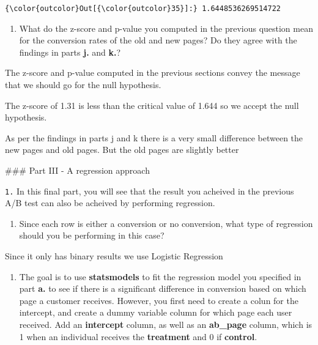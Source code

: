 \documentclass[11pt]{article}
\providecommand{\tightlist}{%
      \setlength{\itemsep}{0pt}\setlength{\parskip}{0pt}}
\begin{document}
\begin{Verbatim}[commandchars=\\\{\}]
{\color{outcolor}Out[{\color{outcolor}35}]:} 1.6448536269514722
\end{Verbatim}
            
    \begin{enumerate}
\def\labelenumi{\alph{enumi}.}
\setcounter{enumi}{13}
\tightlist
\item
  What do the z-score and p-value you computed in the previous question
  mean for the conversion rates of the old and new pages? Do they agree
  with the findings in parts \textbf{j.} and \textbf{k.}?
\end{enumerate}

    The z-score and p-value computed in the previous sections convey the
message that we should go for the null hypothesis.

The z-score of 1.31 is less than the critical value of 1.644 so we
accept the null hypothesis.

As per the findings in parts j and k there is a very small difference
between the new pages and old pages. But the old pages are slightly
better

     \#\#\# Part III - A regression approach

\texttt{1.} In this final part, you will see that the result you
acheived in the previous A/B test can also be acheived by performing
regression.

\begin{enumerate}
\def\labelenumi{\alph{enumi}.}
\tightlist
\item
  Since each row is either a conversion or no conversion, what type of
  regression should you be performing in this case?
\end{enumerate}

    Since it only has binary results we use Logistic Regression

    \begin{enumerate}
\def\labelenumi{\alph{enumi}.}
\setcounter{enumi}{1}
\tightlist
\item
  The goal is to use \textbf{statsmodels} to fit the regression model
  you specified in part \textbf{a.} to see if there is a significant
  difference in conversion based on which page a customer receives.
  However, you first need to create a colun for the intercept, and
  create a dummy variable column for which page each user received. Add
  an \textbf{intercept} column, as well as an \textbf{ab\_page} column,
  which is 1 when an individual receives the \textbf{treatment} and 0 if
  \textbf{control}.
\end{enumerate}
\end{document}
